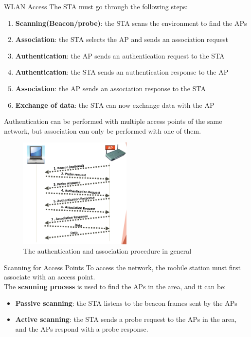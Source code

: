 \begin{section}{WLAN Access}
  The STA must go through the following steps:
  \begin{enumerate}
    \item \textbf{Scanning(Beacon/probe)}: the STA scans the environment to find the APs
    \item \textbf{Association}: the STA selects the AP and sends an association request
    \item \textbf{Authentication}: the AP sends an authentication request to the STA
    \item \textbf{Authentication}: the STA sends an authentication response to the AP
    \item \textbf{Association}: the AP sends an association response to the STA
    \item \textbf{Exchange of data}: the STA can now exchange data with the AP
  \end{enumerate}
  Authentication can be performed with multiple access points of the same network, but association can only
  be performed with one of them.
  \begin{figure}[h]
    \centering
    \includegraphics[width=0.5\textwidth]{img/wireless/wireless auth-ass.png}
    \caption{The authentication and association procedure in general}
  \end{figure}
  \begin{subsection}{Scanning for Access Points}
    To access the network, the mobile station must first associate with an access point.\\
    The \textbf{scanning process} is used to find the APs in the area, and it can be:
    \begin{itemize}
      \item \textbf{Passive scanning}: the STA listens to the beacon frames sent by the APs
      \item \textbf{Active scanning}: the STA sends a probe request to the APs in the area,
        and the APs respond with a probe response.

\end{itemize}
\end{subsection}
\end{section}
